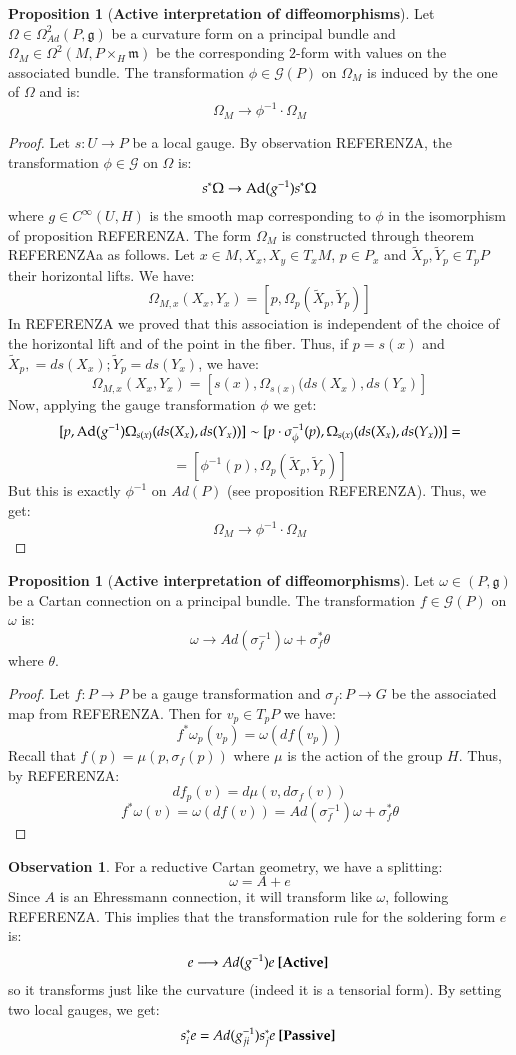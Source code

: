 \documentclass[12pt,a4paper]{report}
\theoremstyle{definition}
\theoremstyle{Theorem}
\newtheorem{Prop}[Def]{Proposition}
\theoremstyle{break}
\theoremstyle{definition}
\newtheorem{Obs}[Def]{Observation}
\begin{document}
	\begin{Prop} [\textbf{Active interpretation of diffeomorphisms}]
		Let $\Omega\in \Omega^2_{Ad}(P,\mathfrak{g})$ be a curvature form on a principal bundle and $\Omega_M\in\Omega^2(M,P\times_{H}\mathfrak{m})$ be the corresponding $2$-form with values on the associated bundle. The transformation $\phi\in\mathcal{G}(P)$ on $\Omega_M$ is induced by the one of $\Omega$ and is:
		$$\Omega_M\rightarrow \phi^{-1}\cdot \Omega_M$$
	\end{Prop}
	\begin{proof}
		Let $s:U\rightarrow P$ be a local gauge. By observation REFERENZA, the transformation $\phi\in\mathcal{G}$ on $\Omega$ is:
		$$s^*\Omega\rightarrow \hbox{Ad}(g^{-1})s^*\Omega$$
		where $g\in C^\infty(U,H)$ is the smooth map corresponding to $\phi$ in the isomorphism of proposition REFERENZA. The form $\Omega_M$ is constructed through theorem REFERENZAa as follows. Let $x\in M,X_x,X_y\in T_xM$, $p\in P_x$ and $\tilde{X}_p,\tilde{Y}_p\in T_pP$ their horizontal lifts. We have:
		$$\Omega_{M,x}(X_x,Y_x)=[p,\Omega_p(\tilde{X}_p,\tilde{Y}_p)]$$
		In REFERENZA we proved that this association is independent of the choice of the horizontal lift and of the point in the fiber. Thus, if $p=s(x)$ and $\tilde{X}_p,=ds(X_x);\tilde{Y}_p=ds(Y_x)$, we have:
		$$\Omega_{M,x}(X_x,Y_x)=[s(x),\Omega_{s(x)}(ds(X_x),ds(Y_x)]$$
		Now, applying the gauge transformation $\phi$ we get:
		$$[p,\hbox{Ad}(g^{-1})\Omega_{s(x)}(ds(X_x),ds(Y_x))]\sim [p\cdot \sigma^{-1}_\phi(p),\Omega_{s(x)}(ds(X_x),ds(Y_x))]=$$
		$$=[\phi^{-1}(p),\Omega_p(\tilde{X}_p,\tilde{Y}_p)]$$
		But this is exactly $\phi^{-1}$ on $Ad(P)$ (see proposition REFERENZA). Thus, we get:
		$$\Omega_M\rightarrow \phi^{-1}\cdot \Omega_M$$
	\end{proof}
	\begin{Prop} [\textbf{Active interpretation of diffeomorphisms}]
		Let $\omega\in (P,\mathfrak{g})$ be a Cartan connection on a principal bundle. The transformation $f\in\mathcal{G}(P)$ on $\omega$ is:
		$$\omega\rightarrow Ad(\sigma_f^{-1}) \omega+\sigma_f^*\theta$$
		where $\theta$.
	\end{Prop}
	\begin{proof}
		Let $f:P\rightarrow P$ be a gauge transformation and $\sigma_f:P\rightarrow G$ be the associated map from REFERENZA. Then for $v_p\in T_pP$ we have:
		$$f^*\omega_p(v_p)=\omega(df(v_p))$$
		Recall that $f(p)=\mu(p,\sigma_f(p))$ where $\mu$ is the action of the group $H$. Thus, by REFERENZA: 
		$$df_p(v)=d\mu(v,d\sigma_f(v))$$
		$$f^*\omega(v)=\omega(df(v))=Ad(\sigma_f^{-1})\omega+\sigma_f^*\theta$$
	\end{proof}
	\begin{Obs}
		For a reductive Cartan geometry, we have a splitting:
		$$\omega=A+e$$
		Since $A$ is an Ehressmann connection, it will transform like $\omega$, following REFERENZA. This implies that the transformation rule for the soldering form $e$ is:
		$$e\longrightarrow Ad(g^{-1})e\hbox{ \textbf{[Active] }}$$
		so it transforms just like the curvature (indeed it is a tensorial form). By setting two local gauges, we get:
		$$s_i^*e= Ad(g_{ji}^{-1})s_j^*e\hbox{ \textbf{[Passive] }}$$
	\end{Obs}
\end{document}

